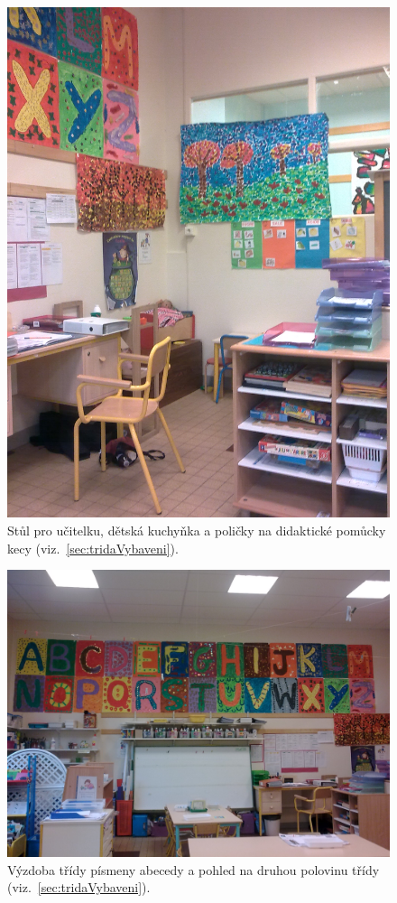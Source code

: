 	\begin{figure}[tb]
		\centering
		\includegraphics[height = 0.35\textheight]{./fotky/Obr5.jpg}
		\caption{
			Stůl pro učitelku, dětská kuchyňka a poličky na didaktické pomůcky kecy (viz.~\ref{sec:tridaVybaveni}).
		}
		\label{Obr5}
	\end{figure}

	\begin{figure}[tb]
		\centering
		\includegraphics[height = 0.35\textheight]{./fotky/Obr6.jpg}
		\caption{
			Výzdoba třídy písmeny abecedy a pohled na druhou polovinu třídy (viz.~\ref{sec:tridaVybaveni}).
		}
		\label{Obr6}
	\end{figure}


